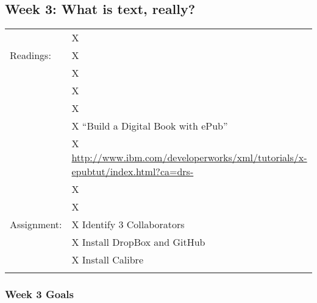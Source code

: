 \documentclass[]{article}
\begin{document}
\subsection{Week 3: What is text,
really?}\label{week-3-what-is-text-really}

\begin{longtable}[c]{@{}ll@{}}
\toprule\addlinespace
& X
\\\addlinespace
Readings: & X
\\\addlinespace
& X
\\\addlinespace
& X
\\\addlinespace
& X
\\\addlinespace
& X ``Build a Digital Book with ePub''
\\\addlinespace
& X
\url{http://www.ibm.com/developerworks/xml/tutorials/x-epubtut/index.html?ca=drs-}
\\\addlinespace
& X
\\\addlinespace
& X
\\\addlinespace
Assignment: & X Identify 3 Collaborators
\\\addlinespace
& X Install DropBox and GitHub
\\\addlinespace
& X Install Calibre
\\\addlinespace
\bottomrule
\end{longtable}

\subsubsection{Week 3 Goals}\label{week-3-goals}
\end{document}
